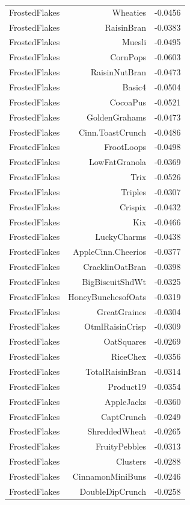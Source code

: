 \begin{longtable}{@{}lrr@{}}
FrostedFlakes & Wheaties & -0.0456 \\
FrostedFlakes & RaisinBran & -0.0383 \\
FrostedFlakes & Muesli & -0.0495 \\
FrostedFlakes & CornPops & -0.0603 \\
FrostedFlakes & RaisinNutBran & -0.0473 \\
FrostedFlakes & Basic4 & -0.0504 \\
FrostedFlakes & CocoaPus & -0.0521 \\
FrostedFlakes & GoldenGrahams & -0.0473 \\
FrostedFlakes & Cinn.ToastCrunch & -0.0486 \\
FrostedFlakes & FrootLoops & -0.0498 \\
FrostedFlakes & LowFatGranola & -0.0369 \\
FrostedFlakes & Trix & -0.0526 \\
FrostedFlakes & Triples & -0.0307 \\
FrostedFlakes & Crispix & -0.0432 \\
FrostedFlakes & Kix & -0.0466 \\
FrostedFlakes & LuckyCharms & -0.0438 \\
FrostedFlakes & AppleCinn.Cheerios & -0.0377 \\
FrostedFlakes & CracklinOatBran & -0.0398 \\
FrostedFlakes & BigBiscuitShdWt & -0.0325 \\
FrostedFlakes & HoneyBunchesofOats & -0.0319 \\
FrostedFlakes & GreatGraines & -0.0304 \\
FrostedFlakes & OtmlRaisinCrisp & -0.0309 \\
FrostedFlakes & OatSquares & -0.0269 \\
FrostedFlakes & RiceChex & -0.0356 \\
FrostedFlakes & TotalRaisinBran & -0.0314 \\
FrostedFlakes & Product19 & -0.0354 \\
FrostedFlakes & AppleJacks & -0.0360 \\
FrostedFlakes & CaptCrunch & -0.0249 \\
FrostedFlakes & ShreddedWheat & -0.0265 \\
FrostedFlakes & FruityPebbles & -0.0313 \\
FrostedFlakes & Clusters & -0.0288 \\
FrostedFlakes & CinnamonMiniBuns & -0.0246 \\
FrostedFlakes & DoubleDipCrunch & -0.0258 \\

\end{longtable}
